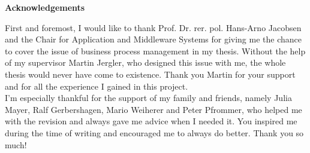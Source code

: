 \clearemptydoublepage
{}
{}	



\vspace*{2cm}

\begin{center}
{\Large \bf Acknowledgements}
\end{center}

\vspace{1cm}

First and foremost, I would like to thank Prof. Dr. rer. pol. Hans-Arno Jacobsen and the Chair for Application and Middleware Systems for giving me the chance to cover the issue of business process management in my thesis. Without the help of my supervisor Martin Jergler, who designed this issue with me, the whole thesis would never have come to existence. Thank you Martin for your support and for all the experience I gained in this project. \\
I'm especially thankful for the support of my family and friends, namely Julia Mayer, Ralf Gerbershagen, Mario Weiherer and Peter Pfrommer, who helped me with the revision and always gave me advice when I needed it. You inspired me during the time of writing and encouraged me to always do better. Thank you so much! 